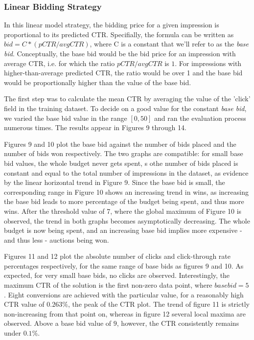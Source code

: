 \documentclass{sig-alternate-05-2015}
\begin{document}
\subsubsection{Linear Bidding Strategy}

In this linear model strategy, the bidding price for a given impression is proportional to its predicted CTR. Specifially, the formula can be written as $bid = C * (pCTR / avg CTR) $, where C is a constant that we'll refer to as the \textit{base bid}. Conceptually, the base bid would be the bid price for an impression with average CTR, i.e. for which the ratio $pCTR / avg CTR$ is $1$. For impressions with higher-than-average predicted CTR, the ratio would be over 1 and the base bid would be proportionally higher than the value of the base bid.

The first step was to calculate the mean CTR by averaging the value of the 'click' field in the training dataset. To decide on a good value for the constant \textit{base bid}, we varied the base bid value in the range $[0, 50]$ and ran the evaluation process numerous times. The results appear in Figures 9 through 14.

Figures 9 and 10 plot the base bid against the number of bids placed and the number of bids won respectively. The two graphs are compatible: for small base bid values, the whole budget never gets spent, s othe number of bids placed is constant and equal to the total number of impressions in the dataset, as evidence by the linear horizontal trend in Figure 9. Since the base bid is small, the corresponding range in Figure 10 shows an increasing trend in wins, as increasing the base bid leads to more percentage of the budget being spent, and thus more wins. After the threshold value of 7, where the global maximum of Figure 10 is observed,  the trend in both graphs becomes asymptotically decreasing. The whole budget is now being spent, and an increasing base bid implies more expensive - and thus less - auctions being won.

Figures 11 and 12 plot the absolute number of clicks and click-through rate percentages respectively, for the same range of base bids as figures 9 and 10. As expected, for very small base bids, no clicks are observed. Interestingly, the maximum CTR of the solution is the first non-zero data point, where $base bid = 5$. Eight conversions are achieved with the particular value, for a reasonably high CTR value of $0.263\%$, the peak of the CTR plot. The trend of figure 11 is strictly non-increasing from that point on, whereas in figure 12 several local maxima are observed. Above a base bid value of $9$, however, the CTR consistently remains under $0.1\%$.
\end{document}
